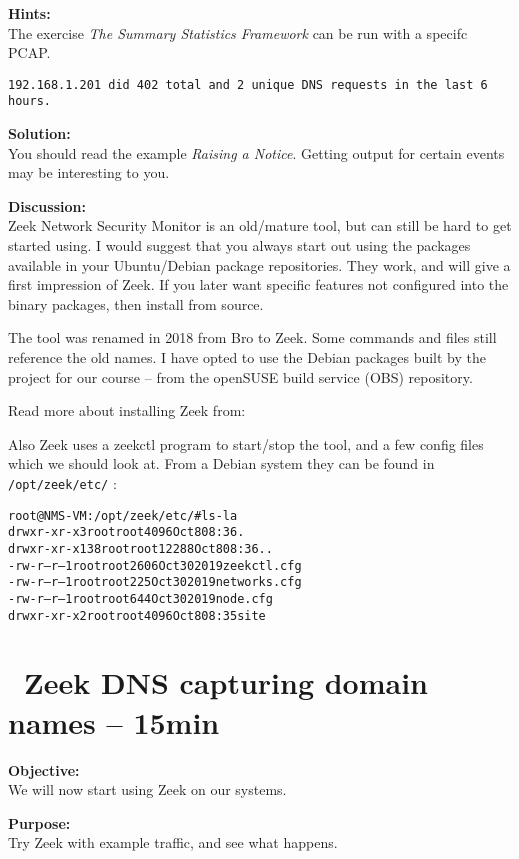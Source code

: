 \documentclass[a4paper,11pt,notitlepage]{report}
\begin{document}
{\bf Hints:}\\
The exercise
\emph{The Summary Statistics Framework} can be run with a specifc PCAP.

\verb+192.168.1.201 did 402 total and 2 unique DNS requests in the last 6 hours.+

{\bf Solution:}\\
You should read the example \emph{Raising a Notice}. Getting output for certain events may be interesting to you.


{\bf Discussion:}\\
Zeek Network Security Monitor is an old/mature tool, but can still be hard to get started using. I would suggest that you always start out using the packages available in your Ubuntu/Debian package repositories.  They work, and will give a first impression of Zeek. If you later want specific features not configured into the binary packages, then install from source.

The tool was renamed in 2018 from Bro to Zeek. Some commands and files still reference the old names. I have opted to use the Debian packages built by the project for our course -- from the openSUSE build service (OBS) repository.

Read more about installing Zeek from: 

Also Zeek uses a zeekctl program to start/stop the tool, and a few config files which we should look at. From a Debian system they can be found in \verb+/opt/zeek/etc/+ :

\begin{alltt}
root@NMS-VM:/opt/zeek/etc/# ls -la
drwxr-xr-x   3 root root  4096 Oct  8 08:36 .
drwxr-xr-x 138 root root 12288 Oct  8 08:36 ..
-rw-r--r--   1 root root  2606 Oct 30  2019 zeekctl.cfg
-rw-r--r--   1 root root   225 Oct 30  2019 networks.cfg
-rw-r--r--   1 root root   644 Oct 30  2019 node.cfg
drwxr-xr-x   2 root root  4096 Oct  8 08:35 site
\end{alltt}


\chapter{\faExclamationTriangle\ Zeek DNS capturing domain names -- 15min}
\label{ex:zeekdnsbasic}


{\bf Objective:} \\
We will now start using Zeek on our systems.


{\bf Purpose:}\\
Try Zeek with example traffic, and see what happens.
\end{document}
